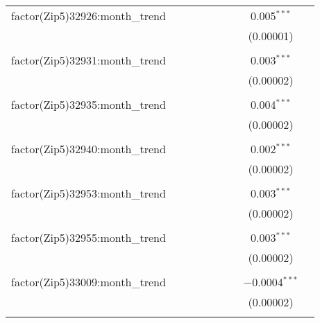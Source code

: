 \begin{table}[H]
{\begin{tabular}{@{\extracolsep{5pt}}lcccccccc}
  factor(Zip5)32926:month\_trend &  &  &  &  &  &  & 0.005$^{***}$ &  \\  

   &  &  &  &  &  &  & (0.00001) &  \\  

   & & & & & & & & \\  

  factor(Zip5)32931:month\_trend &  &  &  &  &  &  & 0.003$^{***}$ &  \\  

   &  &  &  &  &  &  & (0.00002) &  \\  

   & & & & & & & & \\  

  factor(Zip5)32935:month\_trend &  &  &  &  &  &  & 0.004$^{***}$ &  \\  

   &  &  &  &  &  &  & (0.00002) &  \\  

   & & & & & & & & \\  

  factor(Zip5)32940:month\_trend &  &  &  &  &  &  & 0.002$^{***}$ &  \\  

   &  &  &  &  &  &  & (0.00002) &  \\  

   & & & & & & & & \\  

  factor(Zip5)32953:month\_trend &  &  &  &  &  &  & 0.003$^{***}$ &  \\  

   &  &  &  &  &  &  & (0.00002) &  \\  

   & & & & & & & & \\  

  factor(Zip5)32955:month\_trend &  &  &  &  &  &  & 0.003$^{***}$ &  \\  

   &  &  &  &  &  &  & (0.00002) &  \\  

   & & & & & & & & \\  

  factor(Zip5)33009:month\_trend &  &  &  &  &  &  & $-$0.0004$^{***}$ &  \\  

   &  &  &  &  &  &  & (0.00002) &  \\  

   & & & & & & & & \\  


\end{tabular}}
\end{table}
